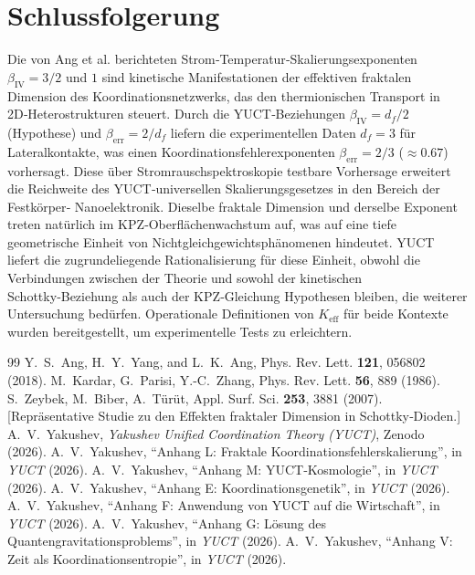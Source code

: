 \documentclass[12pt,a4paper]{article}
\newcommand{\Keff}{K_{\mathrm{eff}}}
\begin{document}
	\section{Schlussfolgerung}
	Die von Ang et al. berichteten Strom‑Temperatur‑Skalierungsexponenten
	$\beta_{\mathrm{IV}} = 3/2$ und $1$ sind kinetische Manifestationen der
	effektiven fraktalen Dimension des Koordinationsnetzwerks, das den
	thermionischen Transport in 2D‑Heterostrukturen steuert. Durch die
	YUCT‑Beziehungen $\beta_{\mathrm{IV}} = d_f/2$ (Hypothese) und
	$\beta_{\mathrm{err}} = 2/d_f$ liefern die experimentellen Daten
	$d_f = 3$ für Lateralkontakte, was einen Koordinationsfehlerexponenten
	$\beta_{\mathrm{err}} = 2/3$ ($\approx 0.67$) vorhersagt. Diese über
	Stromrauschspektroskopie testbare Vorhersage erweitert die Reichweite
	des YUCT‑universellen Skalierungsgesetzes in den Bereich der Festkörper‑
	Nanoelektronik. Dieselbe fraktale Dimension und derselbe Exponent treten
	natürlich im KPZ‑Oberflächenwachstum auf, was auf eine tiefe geometrische
	Einheit von Nichtgleichgewichtsphänomenen hindeutet. YUCT liefert die
	zugrundeliegende Rationalisierung für diese Einheit, obwohl die Verbindungen
	zwischen der Theorie und sowohl der kinetischen Schottky‑Beziehung als auch
	der KPZ‑Gleichung Hypothesen bleiben, die weiterer Untersuchung bedürfen.
	Operationale Definitionen von $\Keff$ für beide Kontexte wurden bereitgestellt,
	um experimentelle Tests zu erleichtern.
	
	\begin{thebibliography}{99}
		 Y.~S.~Ang, H.~Y.~Yang, and L.~K.~Ang,
		Phys. Rev. Lett. \textbf{121}, 056802 (2018).
		 M.~Kardar, G.~Parisi, Y.-C.~Zhang,
		Phys. Rev. Lett. \textbf{56}, 889 (1986).
		 S.~Zeybek, M.~Biber, A.~Türüt,
		Appl. Surf. Sci. \textbf{253}, 3881 (2007). [Repräsentative Studie zu den Effekten fraktaler Dimension in Schottky‑Dioden.]
		 A.~V.~Yakushev, \emph{Yakushev Unified Coordination Theory (YUCT)}, Zenodo (2026).
		 A.~V.~Yakushev, ``Anhang L: Fraktale Koordinationsfehlerskalierung'', in \emph{YUCT} (2026).
		 A.~V.~Yakushev, ``Anhang M: YUCT‑Kosmologie'', in \emph{YUCT} (2026).
		 A.~V.~Yakushev, ``Anhang E: Koordinationsgenetik'', in \emph{YUCT} (2026).
		 A.~V.~Yakushev, ``Anhang F: Anwendung von YUCT auf die Wirtschaft'', in \emph{YUCT} (2026).
		 A.~V.~Yakushev, ``Anhang G: Lösung des Quantengravitationsproblems'', in \emph{YUCT} (2026).
		 A.~V.~Yakushev, ``Anhang V: Zeit als Koordinationsentropie'', in \emph{YUCT} (2026).
	\end{thebibliography}
	
\end{document}
